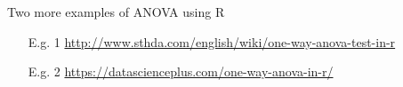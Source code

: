 \begin{frame}{Two more examples of ANOVA using R}
	\begin{enumerate}
		\item[E.g. 1] \url{http://www.sthda.com/english/wiki/one-way-anova-test-in-r}
			\vfill
		\item[E.g. 2] \url{https://datascienceplus.com/one-way-anova-in-r/}
	\end{enumerate}
\end{frame}
